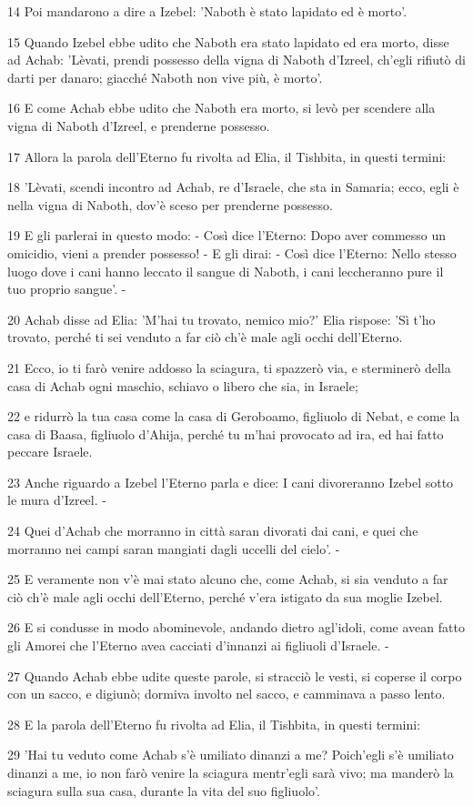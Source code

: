 \par 14 Poi mandarono a dire a Izebel: 'Naboth è stato lapidato ed è morto'.
\par 15 Quando Izebel ebbe udito che Naboth era stato lapidato ed era morto, disse ad Achab: 'Lèvati, prendi possesso della vigna di Naboth d'Izreel, ch'egli rifiutò di darti per danaro; giacché Naboth non vive più, è morto'.
\par 16 E come Achab ebbe udito che Naboth era morto, si levò per scendere alla vigna di Naboth d'Izreel, e prenderne possesso.
\par 17 Allora la parola dell'Eterno fu rivolta ad Elia, il Tishbita, in questi termini:
\par 18 'Lèvati, scendi incontro ad Achab, re d'Israele, che sta in Samaria; ecco, egli è nella vigna di Naboth, dov'è sceso per prenderne possesso.
\par 19 E gli parlerai in questo modo: - Così dice l'Eterno: Dopo aver commesso un omicidio, vieni a prender possesso! - E gli dirai: - Così dice l'Eterno: Nello stesso luogo dove i cani hanno leccato il sangue di Naboth, i cani leccheranno pure il tuo proprio sangue'. -
\par 20 Achab disse ad Elia: 'M'hai tu trovato, nemico mio?' Elia rispose: 'Sì t'ho trovato, perché ti sei venduto a far ciò ch'è male agli occhi dell'Eterno.
\par 21 Ecco, io ti farò venire addosso la sciagura, ti spazzerò via, e sterminerò della casa di Achab ogni maschio, schiavo o libero che sia, in Israele;
\par 22 e ridurrò la tua casa come la casa di Geroboamo, figliuolo di Nebat, e come la casa di Baasa, figliuolo d'Ahija, perché tu m'hai provocato ad ira, ed hai fatto peccare Israele.
\par 23 Anche riguardo a Izebel l'Eterno parla e dice: I cani divoreranno Izebel sotto le mura d'Izreel. -
\par 24 Quei d'Achab che morranno in città saran divorati dai cani, e quei che morranno nei campi saran mangiati dagli uccelli del cielo'. -
\par 25 E veramente non v'è mai stato alcuno che, come Achab, si sia venduto a far ciò ch'è male agli occhi dell'Eterno, perché v'era istigato da sua moglie Izebel.
\par 26 E si condusse in modo abominevole, andando dietro agl'idoli, come avean fatto gli Amorei che l'Eterno avea cacciati d'innanzi ai figliuoli d'Israele. -
\par 27 Quando Achab ebbe udite queste parole, si stracciò le vesti, si coperse il corpo con un sacco, e digiunò; dormiva involto nel sacco, e camminava a passo lento.
\par 28 E la parola dell'Eterno fu rivolta ad Elia, il Tishbita, in questi termini:
\par 29 'Hai tu veduto come Achab s'è umiliato dinanzi a me? Poich'egli s'è umiliato dinanzi a me, io non farò venire la sciagura mentr'egli sarà vivo; ma manderò la sciagura sulla sua casa, durante la vita del suo figliuolo'.

